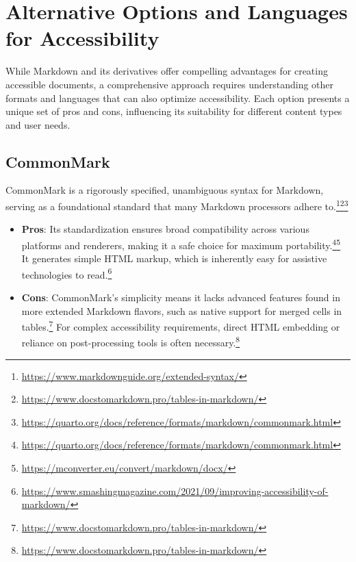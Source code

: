\section{Alternative Options and Languages for Accessibility}

While Markdown and its derivatives offer compelling advantages for creating accessible documents, a comprehensive approach requires understanding other formats and languages that can also optimize accessibility. Each option presents a unique set of pros and cons, influencing its suitability for different content types and user needs.

\subsection{CommonMark}
CommonMark is a rigorously specified, unambiguous syntax for Markdown, serving as a foundational standard that many Markdown processors adhere to.\footnote{\url{https://www.markdownguide.org/extended-syntax/}}\footnote{\url{https://www.docstomarkdown.pro/tables-in-markdown/}}\footnote{\url{https://quarto.org/docs/reference/formats/markdown/commonmark.html}}
\begin{itemize}[noitemsep,topsep=0pt]
    \item \textbf{Pros}: Its standardization ensures broad compatibility across various platforms and renderers, making it a safe choice for maximum portability.\footnote{\url{https://quarto.org/docs/reference/formats/markdown/commonmark.html}}\footnote{\url{https://mconverter.eu/convert/markdown/docx/}} It generates simple HTML markup, which is inherently easy for assistive technologies to read.\footnote{\url{https://www.smashingmagazine.com/2021/09/improving-accessibility-of-markdown/}}
    \item \textbf{Cons}: CommonMark's simplicity means it lacks advanced features found in more extended Markdown flavors, such as native support for merged cells in tables.\footnote{\url{https://www.docstomarkdown.pro/tables-in-markdown/}} For complex accessibility requirements, direct HTML embedding or reliance on post-processing tools is often necessary.\footnote{\url{https://www.docstomarkdown.pro/tables-in-markdown/}}
\end{itemize}

